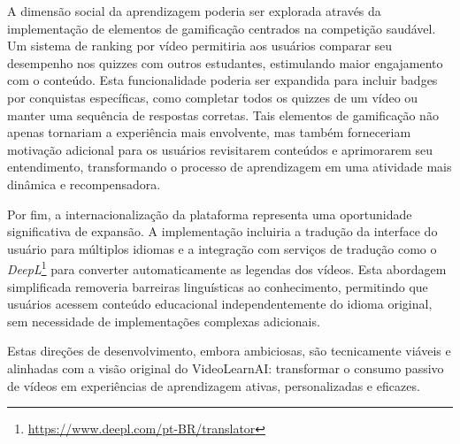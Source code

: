 \documentclass[tcc,capa]{texufpel}
\begin{document}
A dimensão social da aprendizagem poderia ser explorada através da implementação de elementos de gamificação centrados na competição saudável. Um sistema de ranking por vídeo permitiria aos usuários comparar seu desempenho nos quizzes com outros estudantes, estimulando maior engajamento com o conteúdo. Esta funcionalidade poderia ser expandida para incluir badges por conquistas específicas, como completar todos os quizzes de um vídeo ou manter uma sequência de respostas corretas. Tais elementos de gamificação não apenas tornariam a experiência mais envolvente, mas também forneceriam motivação adicional para os usuários revisitarem conteúdos e aprimorarem seu entendimento, transformando o processo de aprendizagem em uma atividade mais dinâmica e recompensadora.

Por fim, a internacionalização da plataforma representa uma oportunidade significativa de expansão. A implementação incluiria a tradução da interface do usuário para múltiplos idiomas e a integração com serviços de tradução como o \textit{DeepL}\footnote{\url{https://www.deepl.com/pt-BR/translator}} para converter automaticamente as legendas dos vídeos. Esta abordagem simplificada removeria barreiras linguísticas ao conhecimento, permitindo que usuários acessem conteúdo educacional independentemente do idioma original, sem necessidade de implementações complexas adicionais.

Estas direções de desenvolvimento, embora ambiciosas, são tecnicamente viáveis e alinhadas com a visão original do VideoLearnAI: transformar o consumo passivo de vídeos em experiências de aprendizagem ativas, personalizadas e eficazes. 














 
\end{document}
